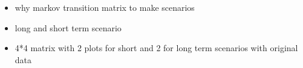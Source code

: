

\begin{itemize}
\item why markov transition matrix to make scenarios
\item long and short term scenario
\item 4*4 matrix with 2 plots for short and 2 for long term scenarios with original data
\end{itemize}